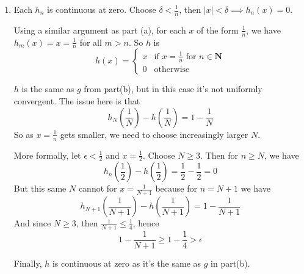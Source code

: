 \documentclass{oxmathproblems}
\begin{document}
\begin{questions}
\begin{solution}
\begin{enumerate}[label=(\alph*)]
   Using a very similar argument as part (a), the limit function $g$ is
    \[
      g(x) = \begin{cases}
        x & \text{if } x = \frac{1}{n} \text{ for } n \in \textbf{N}\\
        0 & \text{otherwise}
      \end{cases}
   \]
   
   But unlike part(a), this is uniformly convergent. The idea is to choose $N$ big enough such that even if $g_{N}(x)=0$, then $x$ needs to be really small, hence
   $|g_{N}(x)-g(x)|=|0-x|=|x|$ is really small as well.

   Formally, choose $N > \frac{1}{\epsilon}$. Then for $n \geq N$, either $g_{n}(x)=g(x)$ or if $g_{n}(x)=0$, then $x=\frac{1}{m}$ with $m > n$.
   But since $n > \frac{1}{\epsilon}$, if $m > n$ then $\frac{1}{m} < \epsilon$, hence $|g_{n}(\frac{1}{m})-g(\frac{1}{m})|=\frac{1}{m} < \epsilon$.

   $g$ is continuous at zero, as $\frac{1}{n}$ converges to zero.

   \item Each $h_{n}$ is continuous at zero. Choose $\delta < \frac{1}{n}$, then $|x| < \delta \implies h_{n}(x) = 0$.
   
   Using a similar argument as part (a), for each $x$ of the form $\frac{1}{n}$, we have $h_{m}(x)=x=\frac{1}{n}$ for all $m > n$. So $h$ is
    \[
      h(x) = \begin{cases}
        x & \text{if } x = \frac{1}{n} \text{ for } n \in \textbf{N}\\
        0 & \text{otherwise}
      \end{cases}
   \]
   
   $h$ is the same as $g$ from part(b), but in this case it's not uniformly convergent. The issue here is that
   \[h_{N}(\frac{1}{N})-h(\frac{1}{N})=1-\frac{1}{N}\]
   So as $x = \frac{1}{n}$ gets smaller, we need to choose increasingly larger $N$.

   More formally, let $\epsilon < \frac{1}{2}$ and $x = \frac{1}{2}$. Choose $N \geq 3$. Then for $n \geq N$, we have
   \[h_{n}(\frac{1}{2})-h(\frac{1}{2})=\frac{1}{2}-\frac{1}{2}=0\]
   But this same $N$ cannot for $x= \frac{1}{N+1}$ because for $n = N+1$ we have
   \[h_{N+1}(\frac{1}{N+1})-h(\frac{1}{N+1})=1-\frac{1}{N+1}\]
   And since $N \geq 3$, then $\frac{1}{N+1} \leq \frac{1}{4}$, hence
   \[1-\frac{1}{N+1} \geq 1-\frac{1}{4} > \epsilon\]

   Finally, $h$ is continuous at zero as it's the same as $g$ in part(b).
  \end{enumerate}
\end{solution}


\end{questions}
\end{document}
